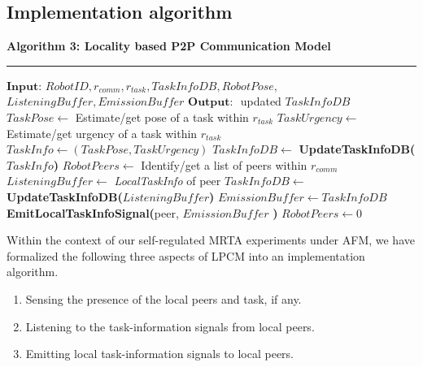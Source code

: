 \documentclass[final,5p,times,twocolumn]{elsarticle}
\newcommand{\HRule}{\rule{\linewidth}{0.3mm}}
\begin{document}
\subsection{Implementation algorithm}
\textbf{\small Algorithm 3: Locality based P2P Communication Model}
\vspace{-3mm}
\newline
\HRule
\begin{algorithmic}[1]
\label{alg:lpcm}
\State $\textbf{Input: } RobotID, r_{comm}, r_{task}, TaskInfoDB, RobotPose,$\\ \hspace*{1cm}$ListeningBuffer, EmissionBuffer$
\State $\textbf{Output: }$ updated $TaskInfoDB$
\State {}
\State $ TaskPose \gets $ Estimate/get pose of a task within $r_{task}$
\State $ TaskUrgency \gets $ Estimate/get urgency of a task within $r_{task}$
\State $ TaskInfo \gets (TaskPose, TaskUrgency) $ 
\State $TaskInfoDB \gets$
\newline
\textbf{UpdateTaskInfoDB(}$TaskInfo$\textbf{)}
\State {}
\State $ RobotPeers \gets $ Identify/get a list of peers within $r_{comm}$
\State $ListeningBuffer \gets $ \textit{\textit{LocalTaskInfo}} of peer
\State $TaskInfoDB \gets$
\newline 
\textbf{UpdateTaskInfoDB(}$ListeningBuffer$\textbf{)}
\EndIf
\EndFor
\State {}
\State $ EmissionBuffer \gets TaskInfoDB$
\State \textbf{EmitLocalTaskInfoSignal(}peer, $EmissionBuffer$ \textbf{) }
\EndFor
\State $RobotPeers \gets 0$
\end{algorithmic}
Within the context of our self-regulated MRTA experiments under AFM,  we have formalized the following three aspects of LPCM into an implementation algorithm. 
\begin{enumerate}
\item Sensing the presence of the local peers and task, if any.
\item Listening to the task-information signals from local peers.
\item Emitting local task-information signals to local peers.
\end{enumerate}
\end{document}
